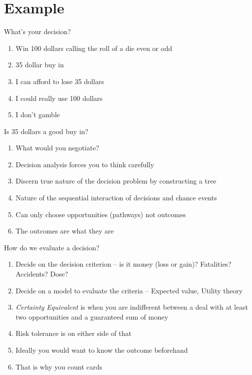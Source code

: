 \documentclass[aspectratio=1610,pdftex,dvipsnames,compress,xcolor={dvipsnames}]{beamer}
\begin{document}
\section{Example}


\addtocounter{framenumber}{-1}
\begin{frame}{What's your decision?}
    \begin{enumerate}[series=outerlist,topsep=0pt,itemsep=21pt,leftmargin=*,label=(\arabic*)]
        \item[]Win 100 dollars calling the roll of a die even or odd
        \item[]35 dollar buy in
        \item[]I can afford to lose 35 dollars  
        \item[]I could really use 100 dollars  
        \item[]I don’t gamble
    \end{enumerate}
\end{frame}


\begin{frame}{Is 35 dollars a good buy in?}
    \begin{enumerate}[series=outerlist,topsep=0pt,itemsep=21pt,leftmargin=*,label=(\arabic*)]
        \item[]What would you negotiate?
        \item[]Decision analysis forces you to think carefully   
        \item[]Discern true nature of the decision problem by constructing a tree
        \item[]Nature of the sequential interaction of decisions and chance events
        \item[]Can only choose opportunities (pathways) not outcomes
        \item[]The outcomes are what they are 
    \end{enumerate}
\end{frame}


\begin{frame}{How do we evaluate a decision?}
    \begin{enumerate}[series=outerlist,topsep=0pt,itemsep=15pt,leftmargin=*,label=(\arabic*)]
        \item[]Decide on the decision criterion -- is it money (loss or gain)? Fatalities? Accidents? Dose? 
        \item[]Decide on a model to evaluate the criteria -- Expected value, Utility theory
        \item[]\textit{Certainty Equivalent} is when you are indifferent between a deal with at least two opportunities and a guaranteed sum of money
        \item[]Risk tolerance is on either side of that 
        \item[]Ideally you would want to know the outcome beforehand
        \item[]That is why you count cards
    \end{enumerate}
\end{frame}
\end{document}
